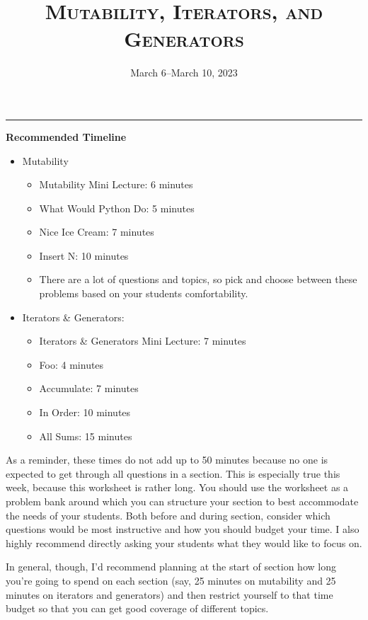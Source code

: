 \documentclass{exam}
\title{\textsc{Mutability, Iterators, and Generators}}
\date{March 6--March 10, 2023}
\begin{document}
\maketitle
\rule{\textwidth}{0.15em}


\begin{guide}
    \textbf{Recommended Timeline}
    \begin{itemize}
        \item Mutability
        \begin{itemize}
            \item Mutability Mini Lecture: 6 minutes
            \item What Would Python Do: 5 minutes
            \item Nice Ice Cream: 7 minutes
            \item Insert N: 10 minutes
            \item There are a lot of questions and topics, so pick and choose between these problems based on your students comfortability.
        \end{itemize}
        \item Iterators \& Generators:
        \begin{itemize}
            \item Iterators \& Generators Mini Lecture: 7 minutes
            \item Foo: 4 minutes
            \item Accumulate: 7 minutes
            \item In Order: 10 minutes
            \item All Sums: 15 minutes
        \end{itemize}
    \end{itemize}

    As a reminder, these times do not add up to 50 minutes because no one is expected 
    to get through all questions in a section. This is especially true this week, 
    because this worksheet is rather long. You should use the worksheet as a problem bank
     around which you can structure your section to best accommodate the needs of your 
     students. Both before and during section, consider which questions would be most 
     instructive and how you should budget your time. I also highly recommend directly asking your students what they would like to focus on.
     
    In general, though, I'd recommend planning at the start of section how long you're going to 
    spend on each section (say, 25 minutes on mutability and 25 minutes on iterators and generators)
    and then restrict yourself to that time budget so that you can get good coverage of different topics. 
\end{guide}
\end{document}
